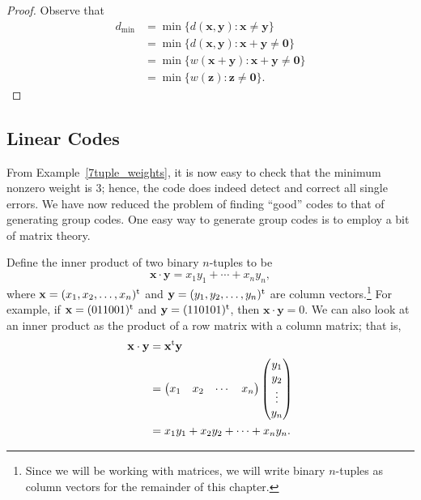  
\begin{proof}
Observe that
\begin{align*}
d_{\min} & =  \min \{ d({\mathbf x},{\mathbf y}) : {\mathbf x}
\neq
{\mathbf y} \} \\
&=  \min \{ d({\mathbf x},{\mathbf y}) : {\mathbf x}+{\mathbf y}
\neq {\mathbf 0} \} \\
&= \min\{ w({\mathbf x} + {\mathbf y}) : {\mathbf x}+{\mathbf y}
\neq {\mathbf 0} \} \\
& =  \min\{ w({\mathbf z}) : {\mathbf z} \neq {\mathbf 0} \}.
\end{align*}
\end{proof}
 
 
\subsection*{Linear Codes}
 
 
From Example~\ref{7tuple_weights}, %
it is now easy to check that the minimum nonzero
weight is 3; hence, the code does indeed detect and correct all
single errors. We have now reduced the problem of finding ``good''
codes to that of generating group codes. One easy way to generate
group codes is to employ a bit of matrix theory. 
 
 
Define the {\bfi inner product\/} of two binary
$n$-tuples to be 
\[
{\mathbf x} \cdot {\mathbf y} = x_1 y_1 + \cdots + x_n y_n,
\]
where ${\mathbf x} = (x_1, x_2, \ldots, x_n)^{\rm t}$ and ${\mathbf y} =
(y_1, y_2, \ldots, y_n)^{\rm t}$ are column vectors.\footnote{Since we
will be working with matrices, we will write binary $n$-tuples as
column vectors for the remainder of this chapter.} For example, if
${\mathbf x} = (011001)^{\rm t}$ and ${\mathbf y} = (110101)^{\rm t}$,
then ${\mathbf x} \cdot {\mathbf y} = 0$. We can also look at an inner
product as the product of a row matrix with a column matrix; that is, 
\begin{align*}
{\mathbf x} \cdot {\mathbf y} & = {\mathbf x}^{\rm t}  {\mathbf y}
\\
& =
\begin{pmatrix}
x_1 & x_2 & \cdots & x_n
\end{pmatrix}
\begin{pmatrix}
y_1 \\
y_2 \\
\vdots \\
y_n
\end{pmatrix} \\
& =
x_{1}y_{1} + x_{2}y_{2} + \cdots + x_{n}y_{n}.
\end{align*}
 
